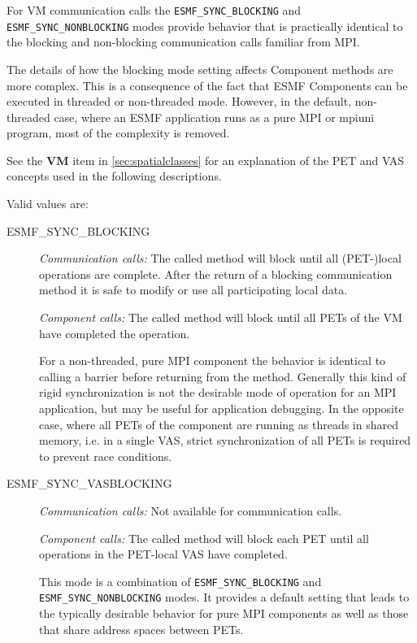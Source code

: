 For VM communication calls the {\tt ESMF\_SYNC\_BLOCKING} and {\tt ESMF\_SYNC\_NONBLOCKING}
modes provide behavior that is practically identical to the blocking and
non-blocking communication calls familiar from MPI.

The details of how the blocking mode setting affects Component methods are
more complex. This is a consequence of the fact that ESMF Components can be
executed in threaded or non-threaded mode. However, in the default,
non-threaded case, where an ESMF application runs as a pure MPI or mpiuni
program, most of the complexity is removed.

See the {\bf VM} item in \ref{sec:spatialclasses} for an
explanation of the PET and VAS concepts used in the following
descriptions.
         
Valid values are:
\begin{description}

\item [ESMF\_SYNC\_BLOCKING]
         {\em Communication calls:} The called method will block until all
         (PET-)local operations are complete. After the return of a blocking
         communication method it is safe to modify or use all participating
         local data.
         
         {\em Component calls:} The called method will block until all PETs of
         the VM have completed the operation.
         
         For a non-threaded, pure MPI
         component the behavior is identical to calling a barrier before 
         returning from the method. Generally this kind of rigid 
         synchronization is not the desirable mode of operation for an MPI
         application, but may be useful for application debugging.
         In the opposite case, where all PETs of the component are running as
         threads in shared memory, i.e. in a single VAS, strict synchronization
         of all PETs is required to prevent race conditions.

\item [ESMF\_SYNC\_VASBLOCKING]
         {\em Communication calls:} Not available for communication calls.
         
         {\em Component calls:} The called method will block each PET until
         all operations in the PET-local VAS have completed. 
         
         This mode is a combination of {\tt ESMF\_SYNC\_BLOCKING} and
         {\tt ESMF\_SYNC\_NONBLOCKING} modes. It provides a default setting 
         that leads to the typically desirable behavior for pure MPI 
         components as well as those that share address spaces between PETs.
         

\end{description}
